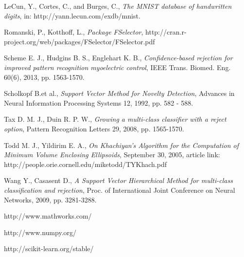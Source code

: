 \documentclass{llncs}
\begin{document}
\begin{thebibliography}{1}

LeCun, Y., Cortes, C., and Burges, C., \emph{The MNIST database of handwritten digits}, in: http://yann.lecun.com/exdb/mnist.

Romanski, P., Kotthoff, L., \emph{Package FSelector}, http://cran.r-project.org/web/packages/FSelector/FSelector.pdf

Scheme E. J., Hudgins B. S., Englehart K. B., \emph{Confidence-based rejection for improved pattern recognition myoelectric control}, IEEE Trans. Biomed. Eng. 60(6), 2013, pp. 1563-1570.

Scholkopf B.et al., \emph{Support Vector Method for Novelty Detection}, Advances in Neural Information Processing Systems 12, 1992, pp. 582 - 588. 

Tax D. M. J., Duin R. P. W., \emph{Growing a multi-class classifier with a reject option}, Pattern Recognition Letters 29, 2008, pp. 1565-1570.

Todd M. J., Yildirim E. A., \emph{On Khachiyan's Algorithm for the Computation of Minimum Volume Enclosing Ellipsoids}, September 30, 2005, article link: http://people.orie.cornell.edu/miketodd/TYKhach.pdf

Wang Y., Casasent D., \emph{A Support Vector Hierarchical Method for multi-class classification and rejection}, Proc. of International Joint Conference on Neural Networks, 2009, pp. 3281-3288.

http://www.mathworks.com/

http://www.numpy.org/

http://scikit-learn.org/stable/

	

 
\end{thebibliography}
\end{document}
